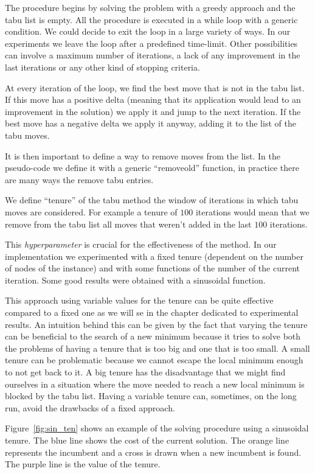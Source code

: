 \documentclass{article}
\begin{document}
The procedure begins by solving the problem with a greedy approach and the tabu list
is empty. All the procedure is executed in a while loop with a generic condition. We could
decide to exit the loop in a large variety of ways. In our experiments we leave the loop
after a predefined time-limit. Other possibilities can involve a maximum number of iterations, a lack of any improvement in the last iterations or any other kind of stopping criteria.

At every iteration of the loop, we find the best move that is not in the tabu list. If this move has a positive delta (meaning that its application would lead to an
improvement in the solution) we apply it and jump to the next iteration. If the best
move has a negative delta we apply it anyway, adding it to the list of the tabu moves.

It is then important to define a way to remove moves from the list. In the pseudo-code we define it with a generic ``removeold'' function, in practice there are many ways the remove tabu entries.

We define ``tenure'' of the tabu method the window of iterations in which tabu moves are considered. For example a tenure of $100$ iterations would mean that we remove
from the tabu list all moves that weren't added in the last $100$ iterations.

This \textit{hyperparameter} is crucial for the effectiveness of the method. In our implementation we experimented with a fixed tenure (dependent on the number of
nodes of the instance) and with some functions of the number of the current iteration. Some good results were obtained with a sinusoidal function.

This approach using variable values for the tenure can be quite effective compared to a fixed one as we will se in the chapter dedicated to experimental results.
An intuition behind this can be given by the fact that varying the tenure can be beneficial to the search of a new minimum because it tries to solve both the problems of having a tenure that is too big and one that is too small.
A small tenure can be problematic because we cannot escape the local minimum enough to not get back to it. A big tenure has the disadvantage that we might find ourselves in a situation where the move needed to reach a new local minimum is blocked by the
tabu list. Having a variable tenure can, sometimes, on the long run, avoid the drawbacks of a fixed approach.

Figure~\ref{fig:sin_ten} shows an example of the solving procedure using
a sinusoidal tenure.
The blue line shows the cost of the current solution. The orange line represents
the incumbent and a cross is drawn when a new incumbent is found.
The purple line is the value of the tenure.
\end{document}
